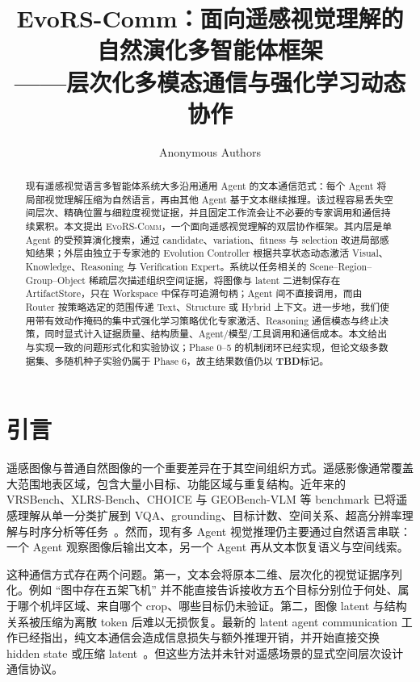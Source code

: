 \documentclass[10pt,a4paper,twocolumn]{ctexart}
\title{\textbf{EvoRS-Comm：面向遥感视觉理解的自然演化多智能体框架\\——层次化多模态通信与强化学习动态协作}}
\author{Anonymous Authors}
\date{}
\newcommand{\ours}{\textsc{EvoRS-Comm}}
\newcommand{\todo}{\textcolor{cred}{\textbf{TBD}}}
\begin{document}
\maketitle
\vspace{-1.4em}

\begin{abstract}
现有遥感视觉语言多智能体系统大多沿用通用 Agent 的文本通信范式：每个 Agent 将局部视觉理解压缩为自然语言，再由其他 Agent 基于文本继续推理。该过程容易丢失空间层次、精确位置与细粒度视觉证据，并且固定工作流会让不必要的专家调用和通信持续累积。本文提出 \ours，一个面向遥感视觉理解的双层协作框架。其内层是单 Agent 的受预算演化搜索，通过 candidate、variation、fitness 与 selection 改进局部感知结果；外层由独立于专家池的 Evolution Controller 根据共享状态动态激活 Visual、Knowledge、Reasoning 与 Verification Expert。系统以任务相关的 Scene--Region--Group--Object 稀疏层次描述组织空间证据，将图像与 latent 二进制保存在 ArtifactStore，只在 Workspace 中保存可追溯句柄；Agent 间不直接调用，而由 Router 按策略选定的范围传递 Text、Structure 或 Hybrid 上下文。进一步地，我们使用带有效动作掩码的集中式强化学习策略优化专家激活、Reasoning 通信模态与终止决策，同时显式计入证据质量、结构质量、Agent/模型/工具调用和通信成本。本文给出与实现一致的问题形式化和实验协议；Phase 0--5 的机制闭环已经实现，但论文级多数据集、多随机种子实验仍属于 Phase 6，故主结果数值仍以 \todo 标记。
\end{abstract}

\section{引言}
遥感图像与普通自然图像的一个重要差异在于其空间组织方式。遥感影像通常覆盖大范围地表区域，包含大量小目标、功能区域与重复结构。近年来的 VRSBench、XLRS-Bench、CHOICE 与 GEOBench-VLM 等 benchmark 已将遥感理解从单一分类扩展到 VQA、grounding、目标计数、空间关系、超高分辨率理解与时序分析等任务~\cite{vrsbench,xlrs,choice,geobench}。然而，现有多 Agent 视觉推理仍主要通过自然语言串联：一个 Agent 观察图像后输出文本，另一个 Agent 再从文本恢复语义与空间线索。

这种通信方式存在两个问题。第一，文本会将原本二维、层次化的视觉证据序列化。例如 ``图中存在五架飞机'' 并不能直接告诉接收方五个目标分别位于何处、属于哪个机坪区域、来自哪个 crop、哪些目标仍未验证。第二，图像 latent 与结构关系被压缩为离散 token 后难以无损恢复。最新的 latent agent communication 工作已经指出，纯文本通信会造成信息损失与额外推理开销，并开始直接交换 hidden state 或压缩 latent~\cite{interlat,macf}。但这些方法并未针对遥感场景的显式空间层次设计通信协议。
\end{document}
